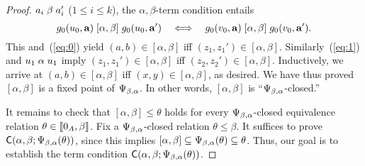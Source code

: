 \begin{proof}
    $a_i \mathrel{\beta} a_i'$ ($1\leq i\leq k$), the $\alpha,\beta$-term condition
    entails
    \[
    g_0(u_0, \mathbf{a}) \mathrel{[\alpha, \beta]} g_0(u_0, \mathbf{a}')
    \quad \Longleftrightarrow \quad 
    g_0(v_0, \mathbf{a}) \mathrel{[\alpha, \beta]} g_0(v_0, \mathbf{a}').
    \]
    This and~(\ref{eq:0}) yield
    $(a,b)\in [\alpha, \beta]$ iff
    $(z_1,z_1')\in [\alpha, \beta]$.
    Similarly~(\ref{eq:1}) and $u_1 \mathrel{\alpha} u_1$ imply
    $(z_1,z_1')\in [\alpha, \beta]$ iff
    $(z_2,z_2')\in [\alpha, \beta]$.  Inductively, we arrive at 
    $(a,b)\in [\alpha, \beta]$ iff $(x,y)\in [\alpha, \beta]$, as desired.
    We have thus proved $[\alpha, \beta]$ is a fixed point of $\Psi_{\beta, \alpha}$.
    In other words, 
    $[\alpha, \beta]$ is ``$\Psi_{\beta, \alpha}$-closed.''

    It remains to check that $[\alpha, \beta] \leq \theta$ holds
    for every $\Psi_{\beta, \alpha}$-closed equivalence relation $\theta \in \llbracket 0_A, \beta\rrbracket$. 
    Fix a $\Psi_{\beta, \alpha}$-closed relation $\theta \leq \beta$. %
    It suffices to prove $\mathsf{C}(\alpha, \beta; \Psi_{\beta, \alpha}(\theta))$, since this implies 
    $[\alpha, \beta] \subseteq \Psi_{\beta, \alpha}(\theta) \subseteq \theta$.
    Thus, our goal is to establish the term condition
    $\mathsf{C}(\alpha, \beta; \Psi_{\beta, \alpha}(\theta))$.


\end{proof}
